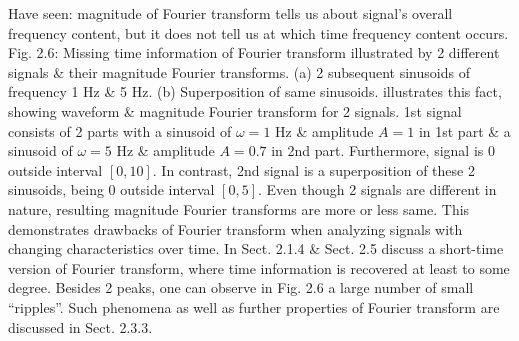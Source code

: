 \documentclass{article}
\begin{document}
\begin{itemize}
\begin{itemize}
\begin{itemize}
			Have seen: magnitude of Fourier transform tells us about signal's overall frequency content, but it does not tell us at which time frequency content occurs. {\sf Fig. 2.6: Missing time information of Fourier transform illustrated by 2 different signals \& their magnitude Fourier transforms. (a) 2 subsequent sinusoids of frequency 1 Hz \& 5 Hz. (b) Superposition of same sinusoids.} illustrates this fact, showing waveform \& magnitude Fourier transform for 2 signals. 1st signal consists of 2 parts with a sinusoid of $\omega = 1$ Hz \& amplitude $A = 1$ in 1st part \& a sinusoid of $\omega = 5$ Hz \& amplitude $A = 0.7$ in 2nd part. Furthermore, signal is 0 outside interval $[0,10]$. In contrast, 2nd signal is a superposition of these 2 sinusoids, being 0 outside interval $[0,5]$. Even though 2 signals are different in nature, resulting magnitude Fourier transforms are more or less same. This demonstrates drawbacks of Fourier transform when analyzing signals with changing characteristics over time. In Sect. 2.1.4 \& Sect. 2.5 discuss a short-time version of Fourier transform, where time information is recovered at least to some degree. Besides 2 peaks, one can observe in {\sf Fig. 2.6} a large number of small ``ripples''. Such phenomena as well as further properties of Fourier transform are discussed in Sect. 2.3.3.
			

\end{itemize}
\end{itemize}
\end{itemize}
\end{document}
